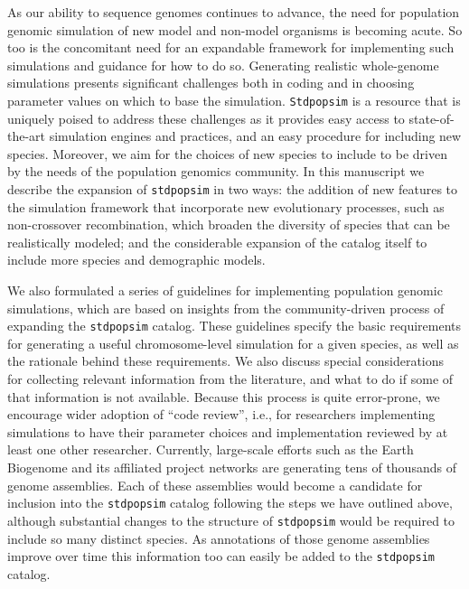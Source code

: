 \documentclass[hidelinks]{article}
\newcommand{\Stdpopsim}{\texttt{Stdpopsim}\xspace}
\newcommand{\stdpopsim}{\texttt{stdpopsim}\xspace}
\begin{document}
As our ability to sequence genomes continues to advance, the need for
population genomic simulation of new model and non-model organisms is becoming acute.
So too is the concomitant need for an expandable framework for implementing such simulations and guidance for how to do so.
Generating realistic whole-genome simulations presents significant challenges
both in coding and in choosing parameter values on which to base the simulation.
\Stdpopsim is a resource that is uniquely poised to address these 
challenges as it provides easy access to state-of-the-art simulation engines and practices, and an easy procedure for including new species.
Moreover, we aim for the choices of new species to include to be driven by the
needs of the population genomics community.
In this manuscript we 
describe the expansion of \stdpopsim in two ways:
the addition of new features to the simulation framework that incorporate new evolutionary processes,
such as non-crossover recombination, which broaden the diversity of species that can
be realistically modeled; and the considerable expansion of the catalog itself
to include more species and demographic models. 

We also formulated a series of guidelines for implementing
population genomic simulations, which are based on
insights from the community-driven process of expanding the \stdpopsim catalog.
These guidelines specify the basic requirements for generating a useful chromosome-level simulation for a given species, as well as the rationale behind these requirements.
We also discuss special considerations for collecting relevant information from the literature,
and what to do if some of that information is not available.
Because this process is quite error-prone,
we encourage wider adoption of ``code review'',
i.e., for researchers implementing simulations to have their
parameter choices and implementation reviewed by at least one other researcher.
Currently, large-scale efforts such as the Earth Biogenome
and its affiliated project networks are generating tens of thousands of genome
assemblies. Each of these assemblies
would become a candidate for inclusion into the
\stdpopsim catalog following the steps we have outlined above,
although substantial changes to the structure of \stdpopsim would be required
to include so many distinct species.
As annotations of those genome assemblies improve over time this information too can easily be added to the \stdpopsim catalog.
\end{document}
